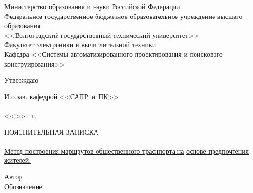 \begin{titlepage}
    \begin{center}
        Министерство образования и науки Российской Федерации \\
        Федеральное государственное бюджетное образовательное учреждение высшего образования\\
        <<Волгоградский государственный технический университет>>\\
        Факультет электроники и вычислительной техники\\
        Кафедра <<Системы автоматизированного проектирования и поискового конструирования>>
    \end{center}
    \begin{flushright}
        \begin{center}
            \hspace*{9.7em}Утверждаю
        \end{center}
        И.о.зав. кафедрой <<САПР~и~ПК>>\\
        \hspace{0.5em}\\
        \vspace{0.5em}<<\underline{\hspace{2.5em}}>> \underline{\hspace{8.5em}} \the\year\ г.
    \end{flushright}
    \begin{center}
        \large ПОЯСНИТЕЛЬНАЯ ЗАПИСКА\\
            {}\\
        \underline{Метод построения маршрутов общественного траснпорта на\hspace{2em}}
        \underline{основе предпочтения жителей.\hspace{0.525\textwidth}}
    \end{center}
    Автор  \quad 
    \\
    Обозначение \UNDER{\underline{\smash{\hspace{6em}\MASTERWORK\hspace{9.2em}}}}

\end{titlepage}

